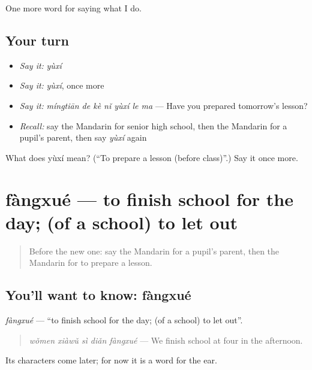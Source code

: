 \begin{grammarlens}[title={What you've built}]
One more word for saying what I do.
\end{grammarlens}

\subsection*{Your turn}
\begin{itemize}
\raggedright
  \item \emph{Say it:} \emph{yùxí}
  \item \emph{Say it:} \emph{yùxí}, once more
  \item \emph{Say it:} \emph{míngtiān de kè nǐ yùxí le ma} — Have you prepared tomorrow's lesson?
  \item \emph{Recall:} say the Mandarin for senior high school, then the Mandarin for a pupil's parent, then say \emph{yùxí} again
\end{itemize}

\begin{tcolorbox}[breakable,colback=teal!4,colframe=teal!35!black,title={Before you move on}]
What does yùxí mean? (\textquotedblleft{}To prepare a lesson (before class)\textquotedblright{}.) Say it once more.
\end{tcolorbox}
\section[fàngxué]{fàngxué — to finish school for the day; (of a school) to let out}

\label{lesson:ZH-C249-fangxue}



\begin{quote}
Before the new one: say the Mandarin for a pupil's parent, then the Mandarin for to prepare a lesson.
\end{quote}

\subsection*{You'll want to know: fàngxué}
\emph{fàngxué} — \textquotedblleft{}to finish school for the day; (of a school) to let out\textquotedblright{}.

\begin{quote}
\emph{wǒmen xiàwǔ sì diǎn fàngxué} — We finish school at four in the afternoon.
\end{quote}

Its characters come later; for now it is a word for the ear.


